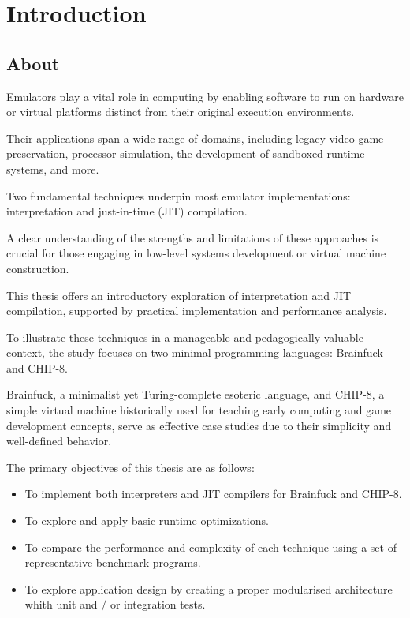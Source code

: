 \chapter{Introduction}
\label{chap:ch1}

\section*{About}
\label{chap:ch1sec1}

\par Emulators play a vital role in computing by enabling software to run on hardware or virtual platforms distinct from their original execution environments.

\par Their applications span a wide range of domains, including legacy video game preservation, processor simulation, the development of sandboxed runtime systems, and more.

\par Two fundamental techniques underpin most emulator implementations: interpretation and just-in-time (JIT) compilation.

\par A clear understanding of the strengths and limitations of these approaches is crucial for those engaging in low-level systems development or virtual machine construction.

\par This thesis offers an introductory exploration of interpretation and JIT compilation, supported by practical implementation and performance analysis.

\par To illustrate these techniques in a manageable and pedagogically valuable context, the study focuses on two minimal programming languages: Brainfuck and CHIP-8.

\par Brainfuck, a minimalist yet Turing-complete esoteric language, and CHIP-8, a simple virtual machine historically used for teaching early computing and game development concepts, serve as effective case studies due to their simplicity and well-defined behavior.

\par The primary objectives of this thesis are as follows:

\begin{itemize}
	\item To implement both interpreters and JIT compilers for Brainfuck and CHIP-8.
	\item To explore and apply basic runtime optimizations.
	\item To compare the performance and complexity of each technique using a set of representative benchmark programs.
	\item To explore application design by creating a proper modularised architecture whith unit and / or integration tests.
\end{itemize}

